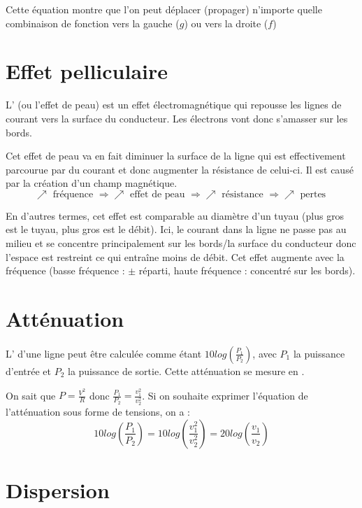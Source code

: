 Cette équation montre que l'on peut déplacer (propager) n'importe quelle combinaison de fonction vers la gauche ($g$) ou vers la droite ($f$)

\section{Effet pelliculaire}

L' (ou l'effet de peau) est un effet électromagnétique qui repousse les lignes de courant vers la surface du conducteur. Les électrons vont donc s'amasser sur les bords.

Cet effet de peau va en fait diminuer la surface de la ligne qui est effectivement parcourue par du courant et donc augmenter la résistance de celui-ci. Il est causé par la création d'un champ magnétique.
\begin{equation*}
\nearrow \text{ fréquence } \Rightarrow \nearrow \text{ effet de peau } \Rightarrow \nearrow \text{ résistance } \Rightarrow \nearrow \text{ pertes }
\end{equation*}

En d'autres termes, cet effet est comparable au diamètre d'un tuyau (plus gros est le tuyau, plus gros est le débit). Ici, le courant dans la ligne ne passe pas au milieu et se concentre principalement sur les bords/la surface du conducteur donc l'espace est restreint ce qui entraîne moins de débit. Cet effet augmente avec la fréquence (basse fréquence : $\pm $ réparti, haute fréquence : concentré sur les bords).

\section{Atténuation}

L' d'une ligne peut être calculée comme étant $10 log(\frac{P_1}{P_2})$, avec $P_1$ la puissance d'entrée et $P_2$ la puissance de sortie. Cette atténuation se mesure en .

On sait que $P=\frac{V^2}{R}$ donc $\frac{P_1}{P_2} = \frac{v_1^2}{v_2^2}$. Si on souhaite exprimer l'équation de l'atténuation sous forme de tensions, on a :
\begin{equation*}
10 log(\frac{P_1}{P_2}) = 10 log(\frac{v_1^2}{v_2^2}) = 20 log(\frac{v_1}{v_2})
\end{equation*}

\section{Dispersion}

